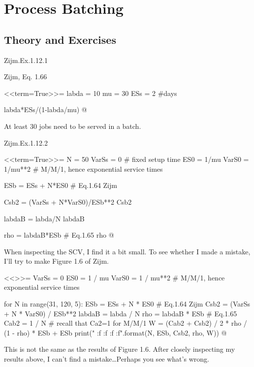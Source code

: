 \section{Process Batching}
\label{sec:process-batching}


\subsection*{Theory and Exercises}
\label{sec:exercises}



\begin{question}
Zijm.Ex.1.12.1
 \begin{solution}
Zijm, Eq. 1.66

<<term=True>>=
labda = 10
mu = 30
ESs = 2 #days

labda*ESs/(1-labda/mu)
@

At least 30 jobs need to be served in a batch.
\end{solution}
\end{question}

\begin{question}
Zijm.Ex.1.12.2
 \begin{solution}

<<term=True>>=
N = 50
VarSs = 0 # fixed setup time
ES0 = 1/mu
VarS0 = 1/mu**2 # M/M/1, hence exponential service times

ESb = ESs + N*ES0 # Eq.1.64 Zijm

Csb2 = (VarSs + N*VarS0)/ESb**2 
Csb2

labdaB = labda/N
labdaB


rho = labdaB*ESb # Eq.1.65
rho 
@

When inspecting the SCV, I find it a bit small. To see whether I made a mistake, I'll try to make Figure 1.6 of Zijm.

<<>>=
VarSs = 0
ES0 = 1 / mu
VarS0 = 1 / mu**2  # M/M/1, hence exponential service times

for N in range(31, 120, 5):
    ESb = ESs + N * ES0  # Eq.1.64 Zijm
    Csb2 = (VarSs + N * VarS0) / ESb**2
    labdaB = labda / N
    rho = labdaB * ESb  # Eq.1.65
    Cab2 = 1 / N  # recall that Ca2=1 for M/M/1
    W = (Cab2 + Csb2) / 2 * rho / (1 - rho) * ESb + ESb
    print("{} {:f} {:f} {:f} {:f}".format(N, ESb, Csb2, rho, W))
@

This is not the same as the results of Figure 1.6. After closely
inspecting my results above, I can't find a mistake\ldots Perhaps you see what's wrong.

\end{solution}
\end{question}

